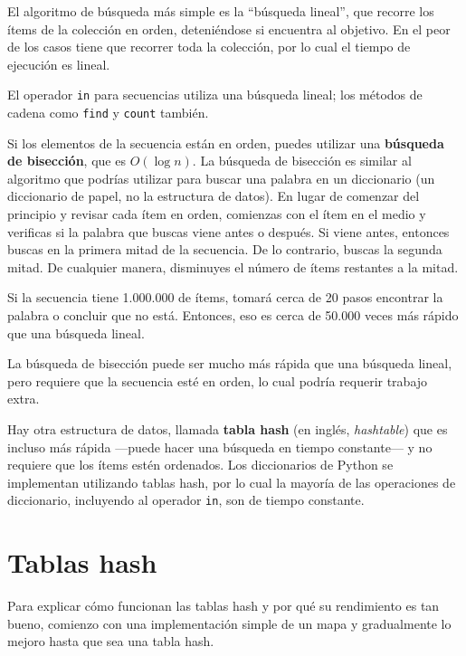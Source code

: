 \documentclass[10pt]{book}
\begin{document}
El algoritmo de búsqueda más simple es la ``búsqueda lineal'', que recorre
los ítems de la colección en orden, deteniéndose si encuentra al objetivo.
En el peor de los casos tiene que recorrer toda la colección, por lo cual el tiempo
de ejecución es lineal.

El operador {\tt in} para secuencias utiliza una búsqueda lineal; los métodos
de cadena como {\tt find} y {\tt count} también.

Si los elementos de la secuencia están en orden, puedes utilizar una {\bf
  búsqueda de bisección}, que es $O(\log n)$.  La búsqueda de bisección es
similar al algoritmo que podrías utilizar para buscar una palabra en un
diccionario (un diccionario de papel, no la estructura de datos).  En lugar de
comenzar del principio y revisar cada ítem en orden, comienzas
con el ítem en el medio y verificas si la palabra que buscas
viene antes o después.  Si viene antes, entonces buscas en la
primera mitad de la secuencia.  De lo contrario, buscas la segunda mitad.
De cualquier manera, disminuyes el número de ítems restantes a la mitad.

Si la secuencia tiene 1.000.000 de ítems, tomará cerca de 20 pasos
encontrar la palabra o concluir que no está.  Entonces, eso es cerca de 50.000
veces más rápido que una búsqueda lineal.

La búsqueda de bisección puede ser mucho más rápida que una búsqueda lineal, pero
requiere que la secuencia esté en orden, lo cual podría requerir
trabajo extra.

Hay otra estructura de datos, llamada {\bf tabla hash} (en inglés, {\em hashtable}) que
es incluso más rápida ---puede hacer una búsqueda en tiempo constante--- y
no requiere que los ítems estén ordenados.  Los diccionarios de Python
se implementan utilizando tablas hash, por lo cual la mayoría de las operaciones
de diccionario, incluyendo al operador {\tt in}, son de tiempo constante.


\section{Tablas hash}
\label{hashtable}

Para explicar cómo funcionan las tablas hash y por qué su rendimiento es tan
bueno, comienzo con una implementación simple de un mapa y
gradualmente lo mejoro hasta que sea una tabla hash.
\end{document}
